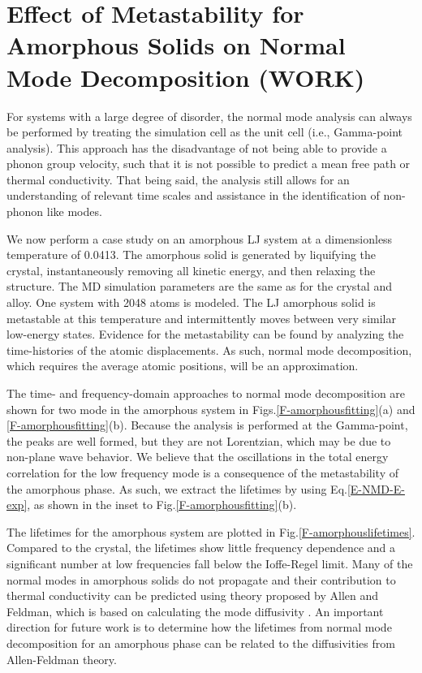 \section{\label{A:metastability}Effect of Metastability for 
Amorphous Solids on Normal Mode Decomposition (WORK)}

For systems with a large degree of disorder, the normal mode analysis can 
always be performed by treating the simulation cell as the unit cell 
(i.e., Gamma-point analysis). This approach has the disadvantage of not 
being able to provide a phonon group velocity, such that it is not 
possible to predict a mean free path or thermal conductivity. That being 
said, the analysis still allows for an understanding of relevant time 
scales and assistance in the identification of non-phonon like modes.
\cite{allen_diffusons_1999}

We now perform a case study on an amorphous LJ system at a dimensionless 
temperature of 0.0413. The amorphous solid is generated by liquifying the 
crystal, instantaneously removing all kinetic energy, and then relaxing 
the structure. The MD simulation parameters are the same as for the 
crystal and alloy. One system with 2048 atoms is modeled. The LJ 
amorphous solid is metastable at this temperature and intermittently 
moves between very similar low-energy states. Evidence for the 
metastability can be found by analyzing the time-histories of the atomic 
displacements. As such, normal mode decomposition, which requires the 
average atomic positions, will be an approximation.

The time- and frequency-domain approaches to normal mode decomposition 
are shown for two mode in the amorphous system in 
Figs.\ref{F-amorphousfitting}(a) and \ref{F-amorphousfitting}(b). 
Because the analysis is performed at the Gamma-point, the peaks are 
well formed, but they are not Lorentzian, which may be due to non-plane 
wave behavior. We believe that the oscillations in the total energy 
correlation for the low frequency mode is a consequence of the 
metastability of the amorphous phase. As such, we extract the lifetimes 
by using Eq.\eqref{E-NMD-E-exp}, as shown in the inset to 
Fig.\ref{F-amorphousfitting}(b).

The lifetimes for the amorphous system are plotted in 
Fig.\ref{F-amorphouslifetimes}. Compared to the crystal, the lifetimes 
show little frequency dependence and a significant number at low 
frequencies fall below the Ioffe-Regel limit. Many of the normal modes 
in amorphous solids do not propagate and their contribution to thermal 
conductivity can be predicted using theory proposed by Allen and Feldman, 
which is based on calculating the mode diffusivity 
\cite{allen_thermal_1993,feldman_thermal_1993,shenogin_predicting_2009,
he_heat_2011}. 
An important 
direction for future work is to determine how the lifetimes from normal 
mode decomposition for an amorphous phase can be related to the 
diffusivities from Allen-Feldman theory.


